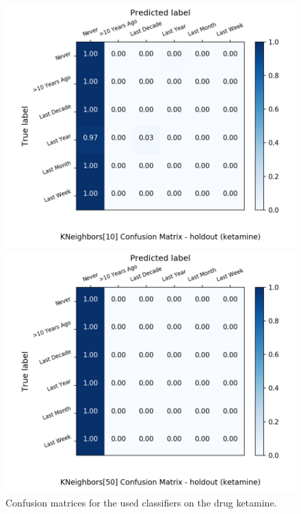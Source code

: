 \begin{figure}[H]
\begin{minipage}[b]{0.32\textwidth}
		\includegraphics[width=1.1\textwidth]{Plots/drugs/ketamine_KNeighbors_10_balance_False_holdout.png}
  \end{minipage}
	\begin{minipage}[b]{0.32\textwidth}
		\includegraphics[width=1.1\textwidth]{Plots/drugs/ketamine_KNeighbors_50_balance_False_holdout.png}
  \end{minipage}
	\caption{Confusion matrices for the used classifiers on the drug ketamine.}
\end{figure}

